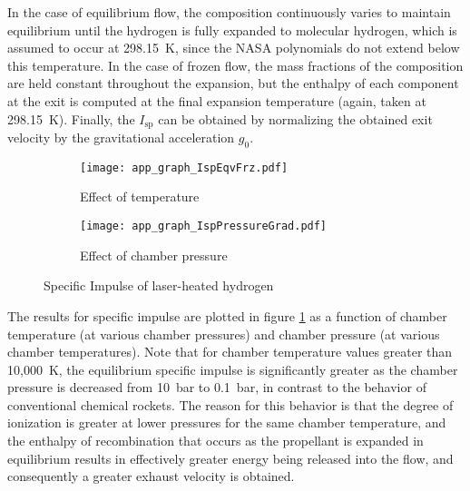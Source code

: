 \documentclass[final,3p,times,twocolumn,sort&compress, lefttitle]{elsarticle}
\begin{document}
             In the case of equilibrium flow, the composition continuously varies to maintain equilibrium until the hydrogen is fully expanded to molecular hydrogen, which is assumed to occur at 298.15~K, since the NASA polynomials do not extend below this temperature. In the case of frozen flow, the mass fractions of the composition are held constant throughout the expansion, but the enthalpy of each component at the exit is computed at the final expansion temperature (again, taken at 298.15~K). Finally, the $I_\mathrm{sp}$ can be obtained by normalizing the obtained exit velocity by the gravitational acceleration $g_0$.
             
             \begin{figure}[h]
                \centering
                \begin{subfigure}[b]{\columnwidth}
                    \centering
                    \texttt{[image: app\_graph\_IspEqvFrz.pdf]}
                    \caption{Effect of temperature}
                    \label{fig:app_IspEqvFrz} 
                \end{subfigure}
                \begin{subfigure}[b]{\columnwidth}
                    \centering
                    \texttt{[image: app\_graph\_IspPressureGrad.pdf]}
                    \caption{Effect of chamber pressure}
                    \label{fig:app_IspPressureGrad}
                \end{subfigure}
                \caption{Specific Impulse of laser-heated hydrogen}
                \label{fig:app_IspDependency}
             \end{figure}
             
             The results for specific impulse are plotted in figure \ref{fig:app_IspEqvFrz} as a function of chamber temperature (at various chamber pressures) and chamber pressure (at various chamber temperatures). Note that for chamber temperature values greater than 10,000~K, the equilibrium specific impulse is significantly greater as the chamber pressure is decreased from 10~bar to 0.1~bar, in contrast to the behavior of conventional chemical rockets. The reason for this behavior is that the degree of ionization is greater at lower pressures for the same chamber temperature, and the enthalpy of recombination that occurs as the propellant is expanded in equilibrium results in effectively greater energy being released into the flow, and consequently a greater exhaust velocity is obtained.
        
\end{document}
